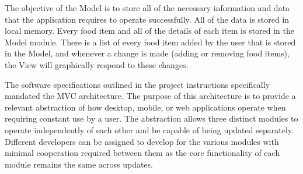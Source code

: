 \documentclass{scrreprt}
\begin{document}
The objective of the Model is to store all of the necessary information and data that the application requires to operate successfully. All of the data is stored in local memory. Every food item and all of the details of each item is stored in the Model module. There is a list of every food item added by the user that is stored in the Model, and whenever a change is made (adding or removing food items), the View will graphically respond to these changes. \\

\begin{center}
\end{center}

The software specifications outlined in the project instructions specifically mandated the MVC architecture. The purpose of this architecture is to provide a relevant abstraction of how desktop, mobile, or web applications operate when requiring constant use by a user. The abstraction allows three distinct modules to operate independently of each other and be capable of being updated separately. Different developers can be assigned to develop for the various modules with minimal cooperation required between them as the core functionality of each module remains the same across updates.
\end{document}

